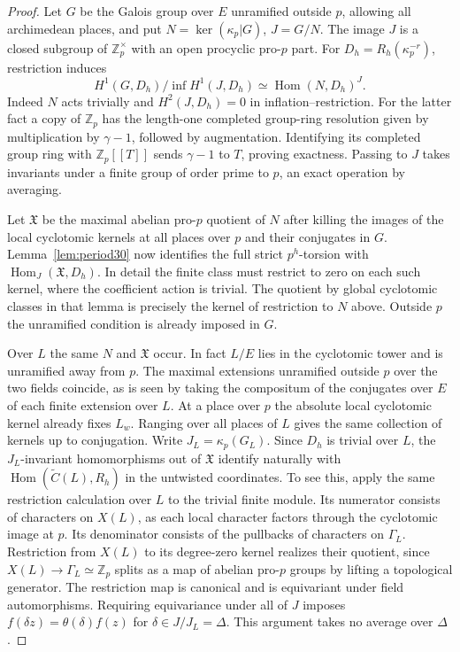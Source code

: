 \documentclass[a4paper,11pt]{article}
\theoremstyle{definition}
\theoremstyle{remark}
\newcommand{\ZZ}{\mathbb Z}\newcommand{\ord}{\operatorname{ord}}
\numberwithin{equation}{section}
\begin{document}
\begin{proof}
Let \(G\) be the Galois group over \(E\) unramified outside
\(p\), allowing all archimedean places, and put
\(N=\ker(\kappa_p|G)\), \(J=G/N\). The image \(J\) is a
closed subgroup of \(\ZZ_p^\times\) with an open procyclic
pro-\(p\) part. For \(D_h=R_h(\kappa_p^{-r})\), restriction
induces
\[
 H^1(G,D_h)/\operatorname{inf}H^1(J,D_h)
                      \simeq\operatorname{Hom}(N,D_h)^J .
\]
Indeed \(N\) acts trivially and \(H^2(J,D_h)=0\) in
inflation--restriction. For the latter fact a copy of
\(\ZZ_p\) has the length-one completed group-ring resolution
given by multiplication by \(\gamma-1\), followed by
augmentation. Identifying its completed group ring with
\(\ZZ_p[[T]]\) sends \(\gamma-1\) to \(T\), proving exactness.
Passing to \(J\) takes invariants under a finite group of
order prime to \(p\), an exact operation by averaging.

Let \(\mathfrak X\) be the maximal abelian pro-\(p\) quotient
of \(N\) after killing the images of the local cyclotomic
kernels at all places over \(p\) and their conjugates in
\(G\). Lemma~\ref{lem:period30} now identifies the full
strict \(p^h\)-torsion with
\(\operatorname{Hom}_J(\mathfrak X,D_h)\). In detail the
finite class must restrict to zero on each such kernel,
where the coefficient action is trivial. The quotient by
global cyclotomic classes in that lemma is precisely the
kernel of restriction to \(N\) above. Outside \(p\) the
unramified condition is already imposed in \(G\).

Over \(L\) the same \(N\) and \(\mathfrak X\) occur.
In fact \(L/E\) lies in the cyclotomic tower and is
unramified away from \(p\). The maximal extensions
unramified outside \(p\) over the two fields coincide,
as is seen by taking the compositum of the conjugates over
\(E\) of each finite extension over \(L\). At a place
over \(p\) the absolute local cyclotomic kernel already
fixes \(L_w\). Ranging over all places of \(L\) gives
the same collection of kernels up to conjugation.
Write \(J_L=\kappa_p(G_L)\). Since \(D_h\) is trivial
over \(L\), the \(J_L\)-invariant homomorphisms out of
\(\mathfrak X\) identify naturally with
\(\operatorname{Hom}(\widetilde C(L),R_h)\) in the
untwisted coordinates. To see this, apply the same
restriction calculation over \(L\) to the trivial finite
module. Its numerator consists of characters on \(X(L)\),
as each local character factors through the cyclotomic
image at \(p\). Its denominator consists of the pullbacks
of characters on \(\Gamma_L\). Restriction from \(X(L)\)
to its degree-zero kernel realizes their quotient, since
\(X(L)\to\Gamma_L\simeq\ZZ_p\) splits as a map of
abelian pro-\(p\) groups by lifting a topological generator.
The restriction map is canonical and is equivariant under
field automorphisms. Requiring equivariance under all of
\(J\) imposes \(f(\delta z)=\theta(\delta) f(z)\) for
\(\delta\in J/J_L=\Delta\). This argument takes no average
over \(\Delta\).


\end{proof}
\end{document}
